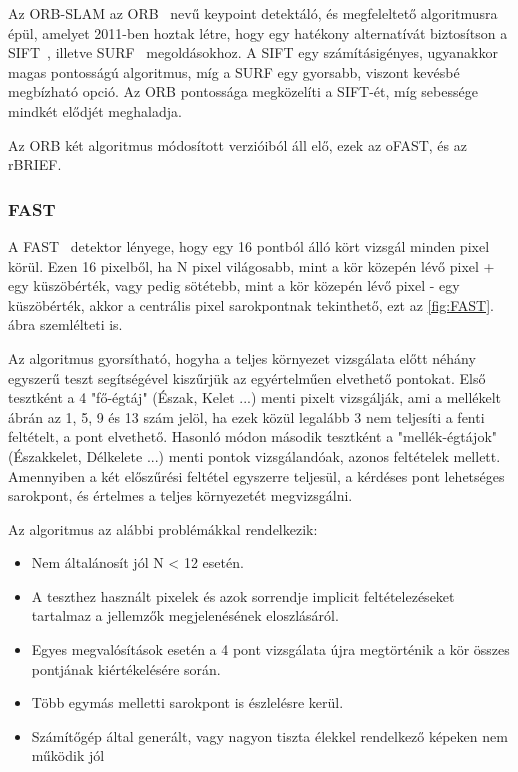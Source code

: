 Az ORB-SLAM az ORB~\cite{rublee2011orb} nevű keypoint detektáló, és megfeleltető algoritmusra épül, amelyet 2011-ben hoztak létre, hogy egy hatékony alternatívát biztosítson a SIFT~\cite{lowe2004distinctive}, illetve SURF~\cite{bay2006surf} megoldásokhoz.
A SIFT egy számításigényes, ugyanakkor magas pontosságú algoritmus, míg a SURF egy gyorsabb, viszont kevésbé megbízható opció.
Az ORB pontossága megközelíti a SIFT-ét, míg sebessége mindkét elődjét meghaladja.

Az ORB két algoritmus módosított verzióiból áll elő, ezek az oFAST, és az rBRIEF.

\subsubsection{FAST}


A FAST~\cite{rosten2006machine} detektor lényege, hogy egy 16 pontból álló kört vizsgál minden pixel körül.
Ezen 16 pixelből, ha N pixel világosabb, mint a kör közepén lévő pixel + egy küszöbérték, vagy pedig sötétebb, mint a kör közepén lévő pixel - egy küszöbérték, akkor a centrális pixel sarokpontnak tekinthető, ezt az \ref{fig:FAST}. ábra szemlélteti is.

Az algoritmus gyorsítható, hogyha a teljes környezet vizsgálata előtt néhány egyszerű teszt segítségével kiszűrjük az egyértelműen elvethető pontokat.
Első tesztként a 4 "fő-égtáj" (Észak, Kelet ...) menti pixelt vizsgálják, ami a mellékelt ábrán az 1, 5, 9 és 13 szám jelöl, ha ezek közül legalább 3 nem teljesíti a fenti feltételt, a pont elvethető.
Hasonló módon második tesztként a "mellék-égtájok" (Északkelet, Délkelete ...) menti pontok vizsgálandóak, azonos feltételek mellett.
Amennyiben a két előszűrési feltétel egyszerre teljesül, a kérdéses pont lehetséges sarokpont, és értelmes a teljes környezetét megvizsgálni.

Az algoritmus az alábbi problémákkal rendelkezik:

\begin{itemize}
	\item Nem általánosít jól N < 12 esetén.
	\item A teszthez használt pixelek és azok sorrendje implicit feltételezéseket tartalmaz a jellemzők megjelenésének eloszlásáról.
	\item Egyes megvalósítások esetén a 4 pont vizsgálata újra megtörténik a kör összes pontjának kiértékelésére során.
	\item Több egymás melletti sarokpont is észlelésre kerül.
	\item Számítőgép által generált, vagy nagyon tiszta élekkel rendelkező képeken nem működik jól
\end{itemize}

